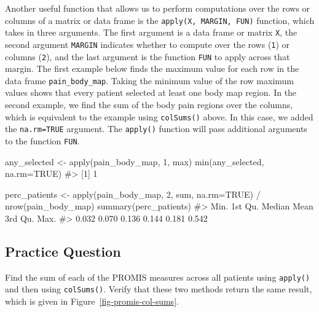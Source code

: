 \documentclass[
  letterpaper,
]{krantz}
\makeatletter
\newenvironment{Shaded}{\begin{snugshade}}{\end{snugshade}}
\newcommand{\AttributeTok}[1]{\textcolor[rgb]{0.40,0.45,0.13}{#1}}
\newcommand{\CommentTok}[1]{\textcolor[rgb]{0.37,0.37,0.37}{#1}}
\newcommand{\ConstantTok}[1]{\textcolor[rgb]{0.56,0.35,0.01}{#1}}
\newcommand{\DecValTok}[1]{\textcolor[rgb]{0.68,0.00,0.00}{#1}}
\newcommand{\FunctionTok}[1]{\textcolor[rgb]{0.28,0.35,0.67}{#1}}
\newcommand{\NormalTok}[1]{\textcolor[rgb]{0.00,0.23,0.31}{#1}}
\newcommand{\OtherTok}[1]{\textcolor[rgb]{0.00,0.23,0.31}{#1}}
\newcommand{\SpecialCharTok}[1]{\textcolor[rgb]{0.37,0.37,0.37}{#1}}
\newenvironment{kframe}{%
\medskip{}
\setlength{\fboxsep}{.8em}
 \def\at@end@of@kframe{}%
 \ifinner\ifhmode%
  \def\at@end@of@kframe{\end{minipage}}%
  \begin{minipage}{\columnwidth}%
 \fi\fi%
 \def\FrameCommand##1{\hskip\@totalleftmargin \hskip-\fboxsep
 \colorbox{shadecolor}{##1}\hskip-\fboxsep
     \hskip-\linewidth \hskip-\@totalleftmargin \hskip\columnwidth}%
 \MakeFramed {\advance\hsize-\width
   \@totalleftmargin\z@ \linewidth\hsize
   \@setminipage}}%
 {\par\unskip\endMakeFramed%
 \at@end@of@kframe}
\renewenvironment{Shaded}{\begin{kframe}}{\end{kframe}}
\makeatother
\begin{document}
Another useful function that allows us to perform computations over the
rows or columns of a matrix or data frame is the
\texttt{apply(X,\ MARGIN,\ FUN)} function, which takes in three
arguments. The first argument is a data frame or matrix \texttt{X}, the
second argument \texttt{MARGIN} indicates whether to compute over the
rows (\texttt{1}) or columns (\texttt{2}), and the last argument is the
function \texttt{FUN} to apply across that margin. The first example
below finds the maximum value for each row in the data frame
\texttt{pain\_body\_map}. Taking the minimum value of the row maximum
values shows that every patient selected at least one body map region.
In the second example, we find the sum of the body pain regions over the
columns, which is equivalent to the example using \texttt{colSums()}
above. In this case, we added the \texttt{na.rm=TRUE} argument. The
\texttt{apply()} function will pass additional arguments to the function
\texttt{FUN}.

\begin{Shaded}
\begin{Highlighting}[]
\NormalTok{any\_selected }\OtherTok{\textless{}{-}} \FunctionTok{apply}\NormalTok{(pain\_body\_map, }\DecValTok{1}\NormalTok{, max)}
\FunctionTok{min}\NormalTok{(any\_selected, }\AttributeTok{na.rm=}\ConstantTok{TRUE}\NormalTok{)}
\CommentTok{\#\textgreater{} [1] 1}
\end{Highlighting}
\end{Shaded}

\begin{Shaded}
\begin{Highlighting}[]
\NormalTok{perc\_patients }\OtherTok{\textless{}{-}} \FunctionTok{apply}\NormalTok{(pain\_body\_map, }\DecValTok{2}\NormalTok{, sum, }\AttributeTok{na.rm=}\ConstantTok{TRUE}\NormalTok{) }\SpecialCharTok{/}
  \FunctionTok{nrow}\NormalTok{(pain\_body\_map)}
\FunctionTok{summary}\NormalTok{(perc\_patients)}
\CommentTok{\#\textgreater{}    Min. 1st Qu.  Median    Mean 3rd Qu.    Max. }
\CommentTok{\#\textgreater{}   0.032   0.070   0.136   0.144   0.181   0.542}
\end{Highlighting}
\end{Shaded}

\subsection{Practice Question}\label{practice-question-4}

Find the sum of each of the PROMIS measures across all patients using
\texttt{apply()} and then using \texttt{colSums()}. Verify that these
two methods return the same result, which is given in
Figure~\ref{fig-promis-col-sums}.
\end{document}
